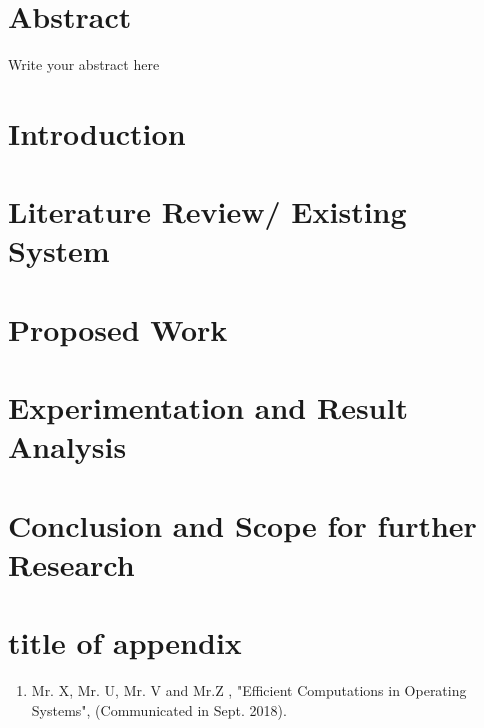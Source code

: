 \documentclass[a4paper, 12pt]{report}
\theoremstyle{definition}
\begin{document}
\chapter*{Abstract}
Write your abstract here  \\

\clearpage
{}
\setcounter{page}{1}
\chapter{Introduction}

\chapter{Literature Review/ Existing System}

\chapter{Proposed Work}

\chapter{Experimentation and Result Analysis}
 
\chapter{Conclusion and Scope for further Research}

\appendix
\chapter{title of appendix}


\newpage
\renewcommand{\bibname}{References}






\begin{enumerate}
	\item [1.] Mr. X, Mr. U, Mr. V and Mr.Z , "Efficient Computations in Operating Systems", (Communicated in Sept. 2018).
\end{enumerate}
\end{document}
